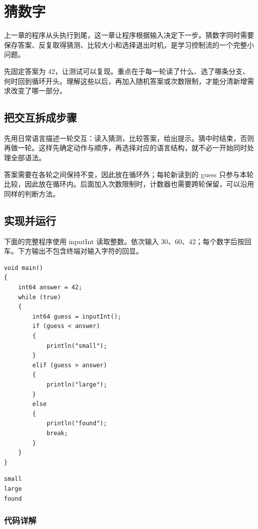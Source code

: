 \chapter{猜数字}
\label{ch:02}

上一章的程序从头执行到尾，这一章让程序根据输入决定下一步。猜数字同时需要保存答案、反复取得猜测、比较大小和选择退出时机，是学习控制流的一个完整小问题。

先固定答案为 42，让测试可以复现。重点在于每一轮读了什么、选了哪条分支、何时回到循环开头。理解这些以后，再加入随机答案或次数限制，才能分清新增需求改变了哪一部分。

\section{把交互拆成步骤}

先用日常语言描述一轮交互：读入猜测，比较答案，给出提示。猜中时结束，否则再做一轮。这样先确定动作与顺序，再选择对应的语言结构，就不必一开始同时处理全部语法。

答案需要在各轮之间保持不变，因此放在循环外；每轮新读到的 guess 只参与本轮比较，因此放在循环内。后面加入次数限制时，计数器也需要跨轮保留，可以沿用同样的判断方法。

\section{实现并运行}

下面的完整程序使用 inputInt 读取整数。依次输入 30、60、42；每个数字后按回车。下方输出不包含终端对输入字符的回显。

\par
\medskip
\begin{lstlisting}[style=chali]
void main()
{
    int64 answer = 42;
    while (true)
    {
        int64 guess = inputInt();
        if (guess < answer)
        {
            println("small");
        }
        elif (guess > answer)
        {
            println("large");
        }
        else
        {
            println("found");
            break;
        }
    }
}
\end{lstlisting}
\par
\medskip

\par
\medskip
\begin{lstlisting}[style=out]
small
large
found
\end{lstlisting}
\par
\medskip

\subsection*{代码详解}

